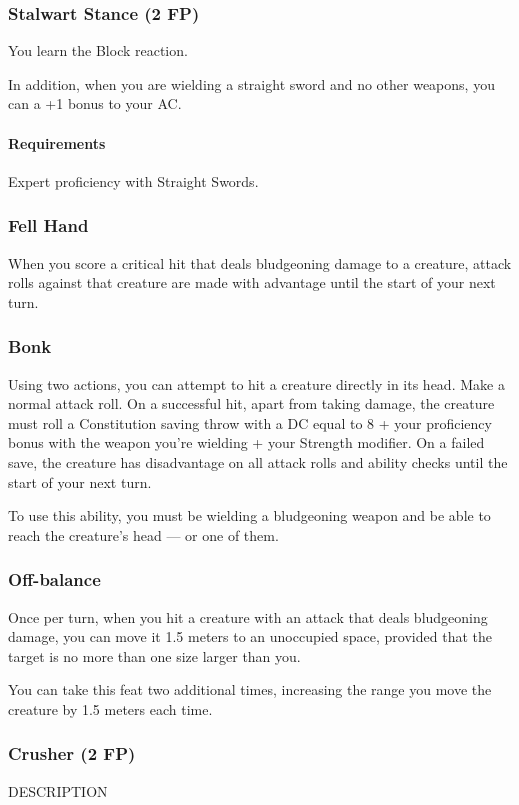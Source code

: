 \subsubsection{Stalwart Stance (2 FP)} \label{feat::stalwartstance}
    You learn the Block reaction.

    In addition, when you are wielding a straight sword and no other weapons, you can a +1 bonus to your AC.
    \paragraph{Requirements} Expert proficiency with Straight Swords.

\subsubsection{Fell Hand} \label{feat::fellhand}
    When you score a critical hit that deals bludgeoning damage to a creature, attack rolls against that creature are made with advantage until the start of your next turn.
\subsubsection{Bonk} \label{feat::bonk}
    Using two actions, you can attempt to hit a creature directly in its head.
    Make a normal attack roll.
    On a successful hit, apart from taking damage, the creature must roll a Constitution saving throw with a DC equal to 8 + your proficiency bonus with the weapon you're wielding + your Strength modifier.
    On a failed save, the creature has disadvantage on all attack rolls and ability checks until the start of your next turn.

    To use this ability, you must be wielding a bludgeoning weapon and be able to reach the creature's head --- or one of them.
\subsubsection{Off-balance} \label{feat::offbalance}
    Once per turn, when you hit a creature with an attack that deals bludgeoning damage, you can move it 1.5 meters to an unoccupied space, provided that the target is no more than one size larger than you.

    You can take this feat two additional times, increasing the range you move the creature by 1.5 meters each time.
\subsubsection{Crusher (2 FP)} \label{feat::crusher}
    DESCRIPTION
